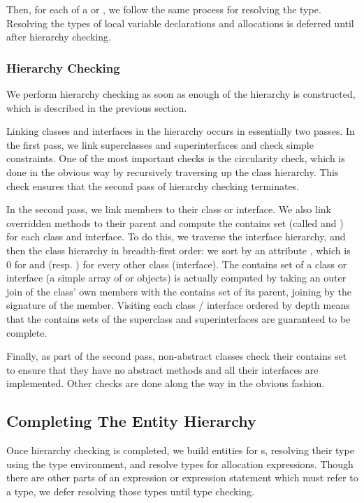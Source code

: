 \documentclass[pdftex,11pt,a4paper]{article}
\begin{document}
Then, for each  of a  or
, we follow the same process for resolving the
type. Resolving the types of local variable declarations and
allocations is deferred until after hierarchy checking.

\subsubsection{Hierarchy Checking}

We perform hierarchy checking as soon as enough of the hierarchy is
constructed, which is described in the previous section.

Linking classes and interfaces in the hierarchy occurs in essentially
two passes. In the first pass, we link superclasses and
superinterfaces and check simple constraints. One of the most
important checks is the circularity check, which is done in the
obvious way by recursively traversing up the class hierarchy. This
check ensures that the second pass of hierarchy checking terminates.

In the second pass, we link members to their class or interface. We also link
overridden methods to their parent and compute the contains set (called
 and ) for each class and interface. To do
this, we traverse the interface hierarchy, and then the class hierarchy in
breadth-first order: we sort by an attribute , which is 0 for
 and  (resp. ) for every other class (interface). The contains set
of a class or interface (a simple array of  or  objects)
is actually computed by taking an outer join of the class' own members with the
contains set of its parent, joining by the signature of the member.  Visiting
each class / interface ordered by depth means that the contains sets of the
superclass and superinterfaces are guaranteed to be complete.

Finally, as part of the second pass, non-abstract classes check their
contains set to ensure that they have no abstract methods and all
their interfaces are implemented. Other checks are done along the way
in the obvious fashion.

\subsection{Completing The Entity Hierarchy}

Once hierarchy checking is completed, we build entities for
s, resolving their type using the type
environment, and resolve types for allocation expressions. Though
there are other parts of an expression or expression statement which
must refer to a type, we defer resolving those types until type
checking.
\end{document}
